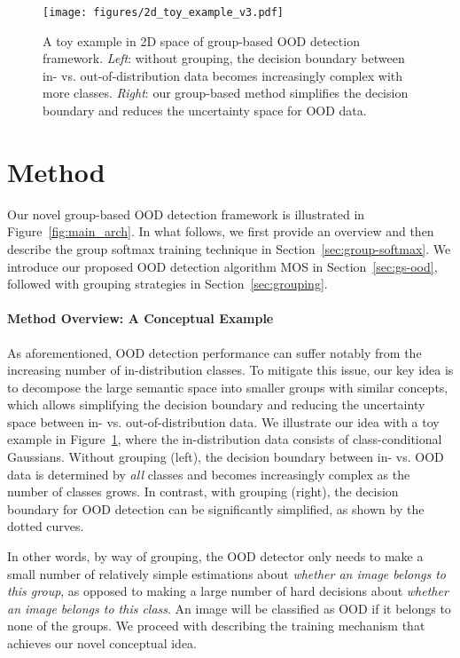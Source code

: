 \documentclass[final]{cvpr}
\begin{document}
\begin{figure}[t]
    \centering
    \texttt{[image: figures/2d\_toy\_example\_v3.pdf]}
    \caption{\small{A toy example in 2D space of group-based OOD detection framework. \emph{Left}: without grouping, the decision boundary between in- vs. out-of-distribution data becomes increasingly complex with more classes. \emph{Right}: our group-based method simplifies the decision boundary and reduces the uncertainty space for OOD data.}}
    \vspace{-0.5cm}
    \label{fig:2d_toy_example}
\end{figure}

\vspace{-0.4cm}

\section{Method}

Our novel group-based OOD detection framework is illustrated
in Figure~\ref{fig:main_arch}. In what follows, we first provide an overview and then describe the group softmax training technique in Section~\ref{sec:group-softmax}. We introduce our proposed OOD detection algorithm MOS in Section~\ref{sec:gs-ood}, followed with grouping strategies in Section~\ref{sec:grouping}. 



\vspace{-0.3cm}
\paragraph{Method Overview: A Conceptual Example} As aforementioned, OOD detection performance can suffer notably from the increasing number of in-distribution classes. To mitigate this issue, our key idea is to decompose the large semantic space into smaller groups with similar concepts, which allows simplifying the decision boundary and reducing the uncertainty space between in- vs. out-of-distribution data. We illustrate our idea with a toy example in Figure~\ref{fig:2d_toy_example}, where the in-distribution data consists of  class-conditional Gaussians. Without grouping (left), the decision boundary between in- vs. OOD data is determined by \emph{all} classes and becomes increasingly complex as the number of classes grows. In contrast, with grouping (right), the decision boundary for OOD detection can be significantly simplified, as shown by the dotted curves. 

In other words, by way of grouping, the OOD detector only needs to make a small number of relatively simple estimations about \textit{whether an image belongs to this group}, as opposed to making a large number of hard decisions about \textit{whether an image belongs to this class}.  An image will be classified as OOD if it belongs to none of the groups. We proceed with describing the training mechanism that achieves our novel conceptual idea.  
\end{document}
